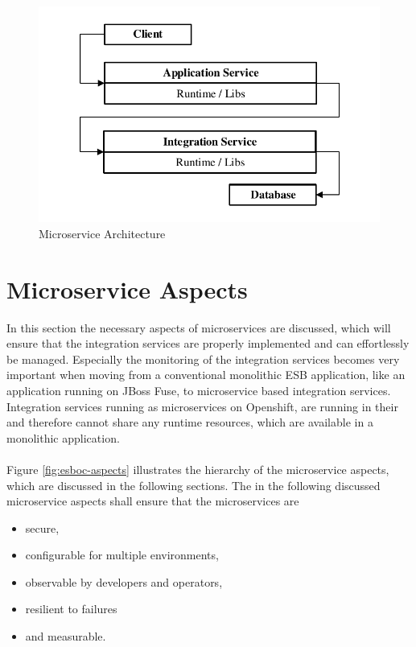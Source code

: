 \begin{figure}[htbp]
	\centering
	\includegraphics[scale=1]{images/esboc-design-microservice.pdf}
	\caption{Microservice Architecture}
	\label{fig:esboc-design-services}
\end{figure}

\section{Microservice Aspects}
\label{sec:esboc-aspects}
In this section the necessary aspects of microservices are discussed, which will ensure that the integration services are properly implemented and can effortlessly be managed. Especially the monitoring of the integration services becomes very important when moving from a conventional monolithic ESB application, like an application running on JBoss Fuse, to microservice based integration services. Integration services running as microservices on Openshift, are running in their and therefore cannot share any runtime resources, which are available in a monolithic application. 
\\ \\
Figure \vref{fig:esboc-aspects} illustrates the hierarchy of the microservice aspects, which are discussed in the following sections. The in the following discussed microservice aspects shall ensure that the microservices are 
\begin{itemize}
	\item secure,
	\item configurable for multiple environments,
	\item observable by developers and operators,
	\item resilient to failures
	\item and measurable.
\end{itemize}


